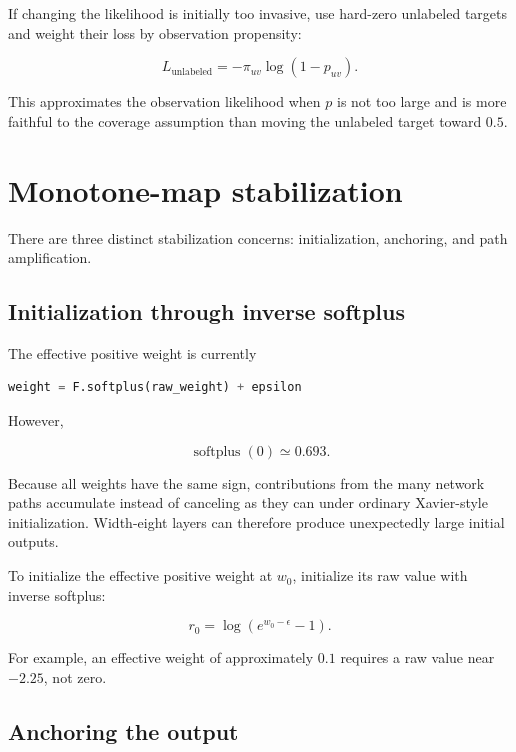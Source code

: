 \documentclass[11pt,a4paper]{article}
\begin{document}
If changing the likelihood is initially too invasive, use hard-zero unlabeled
targets and weight their loss by observation propensity:

\begin{equation}
  L_{\mathrm{unlabeled}}
  = -\pi_{uv}\log(1-p_{uv}).
\end{equation}

This approximates the observation likelihood when $p$ is not too large and is
more faithful to the coverage assumption than moving the unlabeled target
toward $0.5$.

\section{Monotone-map stabilization}

There are three distinct stabilization concerns: initialization, anchoring, and
path amplification.

\subsection{Initialization through inverse softplus}

The effective positive weight is currently

\begin{lstlisting}[language=Python]
weight = F.softplus(raw_weight) + epsilon
\end{lstlisting}

However,

\begin{equation}
  \operatorname{softplus}(0)\simeq0.693.
\end{equation}

Because all weights have the same sign, contributions from the many network
paths accumulate instead of canceling as they can under ordinary Xavier-style
initialization. Width-eight layers can therefore produce unexpectedly large
initial outputs.

To initialize the effective positive weight at $w_0$, initialize its raw value
with inverse softplus:

\begin{equation}
  r_0=\log\left(e^{w_0-\epsilon}-1\right).
\end{equation}

For example, an effective weight of approximately $0.1$ requires a raw value
near $-2.25$, not zero.

\subsection{Anchoring the output}
\end{document}
